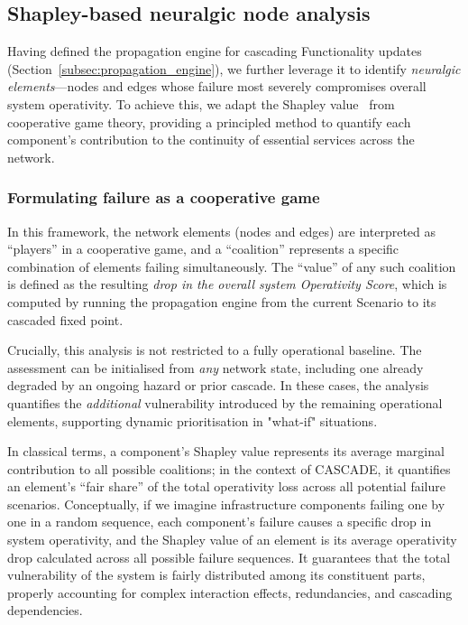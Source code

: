 \documentclass[review,12pt]{elsarticle}
\begin{document}
\subsection{Shapley-based neuralgic node analysis}
\label{subsec:shapley}
Having defined the propagation engine for cascading Functionality updates
(Section~\ref{subsec:propagation_engine}), we further leverage it to identify \emph{neuralgic elements}---nodes and edges whose failure most severely compromises overall system operativity. To achieve this, we adapt the Shapley value~\cite{shapley1953value} from cooperative game theory, providing a principled method to quantify each component's contribution to the continuity of essential services across the network.

\subsubsection{Formulating failure as a cooperative game}
\label{subsubsec:shapley_game}
In this framework, the network elements (nodes and edges) are interpreted as ``players'' in a cooperative game, and a ``coalition'' represents a specific combination of elements failing simultaneously. The ``value'' of any such coalition is defined as the resulting \emph{drop in the overall system Operativity Score}, which is computed by running the propagation engine from the current Scenario to its cascaded fixed point.

Crucially, this analysis is not restricted to a fully operational baseline. The assessment can be initialised from \emph{any} network state, including one already degraded by an ongoing hazard or prior cascade. In these cases, the analysis quantifies the \emph{additional} vulnerability introduced by the remaining operational elements, supporting dynamic prioritisation in "what-if" situations.

In classical terms, a component's Shapley value represents its average marginal contribution to all possible coalitions; in the context of CASCADE, it quantifies an element's ``fair share'' of the total operativity loss across all potential failure scenarios. Conceptually, if we imagine infrastructure components failing one by one in a random sequence, each component's failure causes a specific drop in system operativity, and the Shapley value of an element is its average operativity drop calculated across all possible failure sequences. It guarantees that the total vulnerability of the system is fairly distributed among its constituent parts, properly accounting for complex interaction effects, redundancies, and cascading dependencies.
\end{document}
